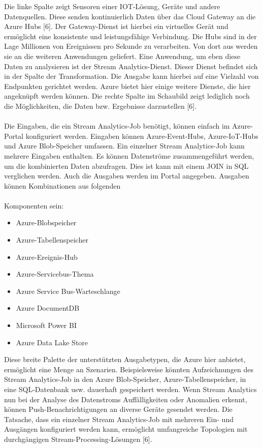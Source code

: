 Die linke Spalte zeigt Sensoren einer IOT-Lösung, Geräte und andere Datenquellen. Diese senden kontinuierlich Daten über das Cloud Gateway an die Azure Hubs [6]. Der Gateway-Dienst ist hierbei ein virtuelles Gerät und ermöglicht eine konsistente und leistungsfähige Verbindung. Die Hubs sind in der Lage Millionen von Ereignissen pro Sekunde zu verarbeiten. Von dort aus werden sie an die weiteren Anwendungen geliefert. Eine Anwendung, um eben diese Daten zu analysieren ist der Stream Analytics-Dienst. Dieser Dienst befindet sich in der Spalte der Transformation. Die Ausgabe kann hierbei auf eine Vielzahl von Endpunkten gerichtet werden. Azure bietet hier einige weitere Dienste, die hier angeknüpft werden können. Die rechte Spalte im Schaubild zeigt lediglich noch die Möglichkeiten, die Daten bzw. Ergebnisse darzustellen [6].\\ \\
Die Eingaben, die ein Stream Analytics-Job benötigt, können einfach im Azure-Portal konfiguriert werden. Eingaben können Azure-Event-Hubs, Azure-IoT-Hubs und Azure Blob-Speicher umfassen. Ein einzelner Stream Analytics-Job kann mehrere Eingaben enthalten. Es können Datenströme zusammengeführt werden, um die kombinierten Daten abzufragen. Dies ist kann mit einem JOIN in SQL verglichen werden. Auch die Ausgaben werden im Portal angegeben. Ausgaben können Kombinationen aus folgenden\\ \\ Komponenten sein:
\begin{itemize}
\item Azure-Blobspeicher 
\item Azure-Tabellenspeicher 
\item Azure-Ereignis-Hub 
\item Azure-Servicebus-Thema 
\item Azure Service Bus-Warteschlange 
\item Azure DocumentDB 
\item Microsoft Power BI 
\item Azure Data Lake Store \\ 
\end{itemize}
Diese breite Palette der unterstützten Ausgabetypen, die Azure hier anbietet, ermöglicht eine Menge an Szenarien. Beispielsweise könnten Aufzeichnungen des Stream Analytics-Job in den Azure Blob-Speicher, Azure-Tabellenspeicher, in eine SQL-Datenbank usw. dauerhaft gespeichert werden. Wenn Stream Analytics nun bei der Analyse des Datenstroms Auffälligkeiten oder Anomalien erkennt, können Push-Benachrichtigungen an diverse Geräte gesendet werden. Die Tatsache, dass ein einzelner Stream Analytics-Job mit mehreren Ein- und Ausgängen konfiguriert werden kann, ermöglicht umfangreiche Topologien mit durchgängigen Stream-Processing-Lösungen [6].